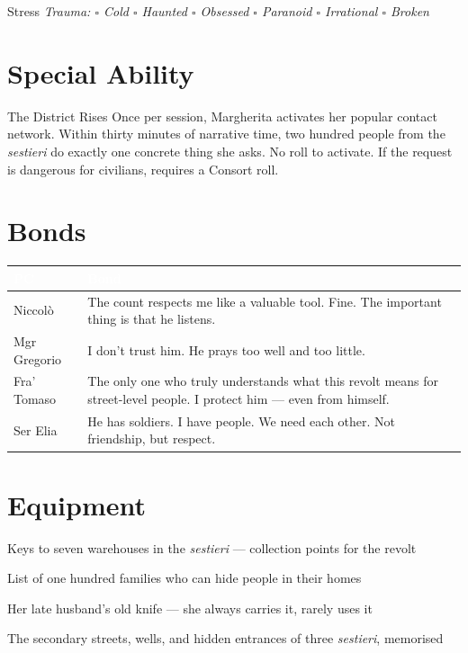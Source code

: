 \medskip
\begin{pgclockbox}{Stress \hfill {}}
\small\textit{Trauma: $\square$ Cold \quad $\square$ Haunted \quad $\square$ Obsessed \quad $\square$ Paranoid \quad $\square$ Irrational \quad $\square$ Broken}
\end{pgclockbox}

\section*{Special Ability}
\begin{fieschibox}{The District Rises}
Once per session, Margherita activates her popular contact network. Within thirty
minutes of narrative time, two hundred people from the \textit{sestieri} do exactly
one concrete thing she asks. No roll to activate. If the request is dangerous for
civilians, requires a Consort roll.
\end{fieschibox}

\section*{Bonds}
\begin{table}[h]\centering\renewcommand{\arraystretch}{1.4}
\begin{tabularx}{\linewidth}{@{}L{2.6cm} X@{}}
\toprule{}
\textcolor{white}{\textbf{PC}} & \textcolor{white}{\textbf{Bond}} \\
\midrule
Niccol\`o & The count respects me like a valuable tool. Fine. The important thing is that he listens. \\
Mgr Gregorio & I don't trust him. He prays too well and too little. \\
Fra' Tomaso & The only one who truly understands what this revolt means for street-level people. I protect him --- even from himself. \\
Ser Elia & He has soldiers. I have people. We need each other. Not friendship, but respect. \\
\bottomrule
\end{tabularx}
\end{table}

\section*{Equipment}
\begin{goldlist}
\item Keys to seven warehouses in the \textit{sestieri} --- collection points for the revolt
\item List of one hundred families who can hide people in their homes
\item Her late husband's old knife --- she always carries it, rarely uses it
\item The secondary streets, wells, and hidden entrances of three \textit{sestieri}, memorised
\end{goldlist}


